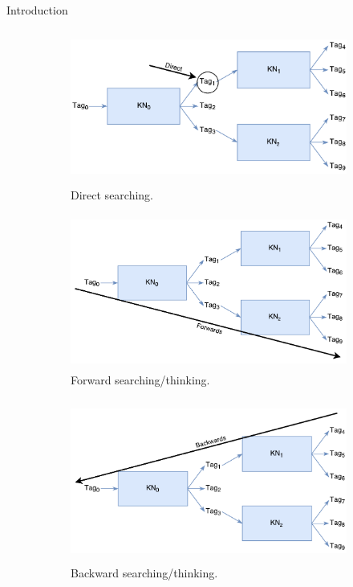 \documentclass[final]{beamer} %
\begin{document}
\begin{frame}
\begin{columns}
\begin{column}{.3\textwidth}
{\begin{block}{Introduction}
					\begin{figure}[!htb]
						\centering
						\begin{subfigure}[!htb]{0.4\columnwidth}
							\centering
							\includegraphics[height=2in]{figures/direct_search.pdf}
							\caption{Direct searching.}
						\end{subfigure}
						\quad
						\begin{subfigure}[!htb]{0.4\columnwidth}
							\centering
							\includegraphics[height=2in]{figures/forwards_thinking.pdf}
							\caption{Forward searching/thinking.}
							\label{think_forwards}
						\end{subfigure}
						\bigskip
						\begin{subfigure}[!htb]{0.4\columnwidth}
							\centering
							\includegraphics[height=2.1in]{figures/backwards_thinking.pdf}
							\caption{Backward searching/thinking.}
							\label{think_backwards}
						\end{subfigure}
						~
						\begin{subfigure}[!htb]{0.4\columnwidth}

\end{subfigure}
\end{figure}
\end{block}}
\end{column}
\end{columns}
\end{frame}
\end{document}
